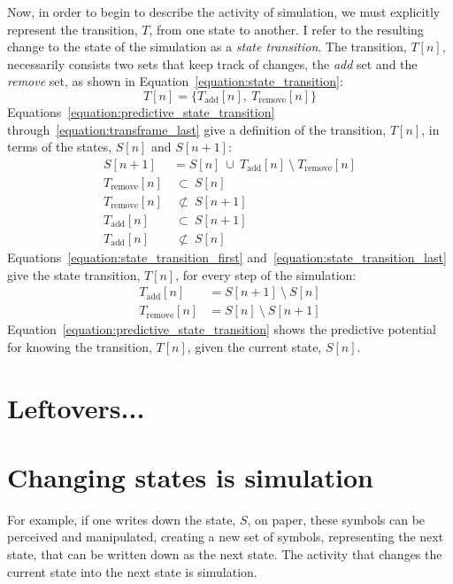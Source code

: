 Now, in order to begin to describe the activity of simulation, we must
explicitly represent the transition, $T$, from one state to another.
I refer to the resulting change to the state of the simulation as a
\emph{state transition}.  The transition, $T[n]$, necessarily consists
two sets that keep track of changes, the \emph{add} set and the
\emph{remove} set, as shown in
Equation~\ref{equation:state_transition}:
\begin{equation}
\label{equation:state_transition}
T[n] = \{T_\text{add}[n], ~T_\text{remove}[n]\}
\end{equation}
Equations~\ref{equation:predictive_state_transition}
through~\ref{equation:transframe_last} give a definition of the
transition, $T[n]$, in terms of the states, $S[n]$ and $S[n+1]$:
\begin{align}
\label{equation:predictive_state_transition}
                    S[n+1] & = S[n] ~{\cup}~ T_\text{add}[n] ~{\setminus}~ T_\text{remove}[n] \\
         T_\text{remove}[n] & ~{\subset}~ S[n] \\
         T_\text{remove}[n] & ~{\not\subset}~ S[n+1] \\
            T_\text{add}[n] & ~{\subset}~ S[n+1] \\
\label{equation:transframe_last}
            T_\text{add}[n] & ~{\not\subset}~ S[n]
\end{align}
Equations~\ref{equation:state_transition_first}
and~\ref{equation:state_transition_last} give the state transition,
$T[n]$, for every step of the simulation:
\begin{align}
  \label{equation:state_transition_first}
     T_\text{add}[n] &= S[n+1] ~{\setminus}~ S[n] \\
  \label{equation:state_transition_last}
  T_\text{remove}[n] &= S[n]   ~{\setminus}~ S[n+1]
\end{align}
Equation~\ref{equation:predictive_state_transition} shows the
predictive potential for knowing the transition, $T[n]$, given the
current state, $S[n]$.


\section{Leftovers...}

\section{Changing states is simulation}

For example, if one writes down the state, $S$, on paper, these
symbols can be perceived and manipulated, creating a new set of
symbols, representing the next state, that can be written down as the
next state.  The activity that changes the current state into the next
state is simulation.

